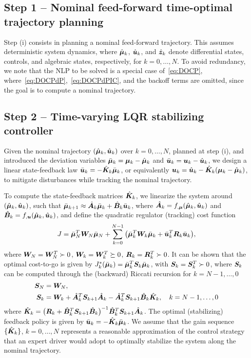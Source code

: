 \subsection{Step 1 -- Nominal feed-forward time-optimal trajectory planning}
\label{sec:nominalFF}
Step (i) consists in planning a nominal feed-forward trajectory. This assumes deterministic system dynamics, where $\hat{\boldsymbol{\mu}}_k$, $\hat{\boldsymbol{u}}_k$, and $\hat{\boldsymbol{z}}_k$ denote differential states, controls, and algebraic states, respectively, for \( k = 0, \ldots, N \). To avoid redundancy, we note that the NLP to be solved is a special case of~\eqref{eq:DOCP}, where~\eqref{eq:DOCPdP},~\eqref{eq:DOCPdPIC}, and the backoff terms are omitted, since the goal is to compute a nominal trajectory.

\subsection{Step 2 -- Time-varying LQR stabilizing controller}
\label{sec:LQR}

Given the nominal trajectory $(\hat{\boldsymbol{\mu}}_k, \hat{\boldsymbol{u}}_k)$ over $k=0,\ldots, N$, planned at step (i), and introduced the deviation variables $\bar{\boldsymbol{\mu}}_k=\boldsymbol{\mu}_k - \hat{\boldsymbol{\mu}}_k$ and $\bar{\boldsymbol{u}}_k = \boldsymbol{u}_k - \hat{\boldsymbol{u}}_k$, we design a linear state-feedback law $\bar{\boldsymbol{u}}_k= -\hat{\boldsymbol{K}}_k \bar{\boldsymbol{\mu}}_k$, or equivalently $\boldsymbol{u}_k = \hat{\boldsymbol{u}}_k - \hat{\boldsymbol{K}}_k (\boldsymbol{\mu}_k - \hat{\boldsymbol{\mu}}_k)$, to mitigate disturbances while tracking the nominal trajectory.

To compute the state-feedback matrices $\hat{\boldsymbol{K}}_k$, we linearize the system around $(\hat{\boldsymbol{\mu}}_k, \hat{\boldsymbol{u}}_k)$, such that $\bar{\boldsymbol{\mu}}_{k+1} \approx \hat{\boldsymbol{A}}_{k}\bar{\boldsymbol{\mu}}_k + \hat{\boldsymbol{B}}_k \bar{\boldsymbol{u}}_k$, where $\hat{\boldsymbol{A}}_k = f_{,\boldsymbol{\mu}}(\hat{\boldsymbol{\mu}}_k,\hat{\boldsymbol{u}}_k)$ and $\hat{\boldsymbol{B}}_k = f_{,\boldsymbol{u}}(\hat{\boldsymbol{\mu}}_k,\hat{\boldsymbol{u}}_k)$, and define the quadratic regulator (tracking) cost function
\begin{align}
J = \bar{\boldsymbol{\mu}}_N^T \boldsymbol{W}_N \bar{\boldsymbol{\mu}}_N + \sum_{k=0}^{N-1} \big( \bar{\boldsymbol{\mu}}_k^{T} \boldsymbol{W}_k \bar{\boldsymbol{\mu}}_k + \bar{\boldsymbol{u}}_k^T \boldsymbol{R}_k \bar{\boldsymbol{u}}_k \big),
\end{align}
where $\boldsymbol{W}_N=\boldsymbol{W}_N^T \succ 0$, $\boldsymbol{W}_k=\boldsymbol{W}_k^T \succeq 0$, $\boldsymbol{R}_k=\boldsymbol{R}_k^T \succ 0$. It can be shown that the optimal cost-to-go is given by $J_k^*(\bar{\boldsymbol{\mu}}_k) = \bar{\boldsymbol{\mu}}_k^T \boldsymbol{S}_k \bar{\boldsymbol{\mu}}_k$, with $\boldsymbol{S}_k = \boldsymbol{S}_k^T \succ 0$, where $\boldsymbol{S}_k$ can be computed through the (backward) Riccati recursion for $k=N-1,\ldots, 0$
\begin{align}
\boldsymbol{S}_N &= \boldsymbol{W}_N,\\
\boldsymbol{S}_{k} &= \boldsymbol{W}_k + \hat{\boldsymbol{A}}_k^T \boldsymbol{S}_{k+1} \hat{\boldsymbol{A}}_k - \hat{\boldsymbol{A}}_k^T \boldsymbol{S}_{k+1}\hat{\boldsymbol{B}}_k \hat{\boldsymbol{K}}_k,\quad k={N-1, \ldots, 0}
\end{align}
where  $\hat{\boldsymbol{K}}_k =\big( \boldsymbol{R}_k+\hat{\boldsymbol{B}}_k^T \boldsymbol{S}_{k+1} \hat{\boldsymbol{B}}_k \big)^{-1} \hat{\boldsymbol{B}}_k^T \boldsymbol{S}_{k+1} \hat{\boldsymbol{A}}_k$. The optimal (stabilizing) feedback policy is given by $\bar{\boldsymbol{u}}_k=-\hat{\boldsymbol{K}}_k \bar{\boldsymbol{\mu}}_k$. We assume that the gain sequence $\{\hat{\boldsymbol{K}}_k\}$, $k=0,\ldots, N$ represents a reasonable approximation of the control strategy that an expert driver would adopt to optimally stabilize the system along the nominal trajectory.

